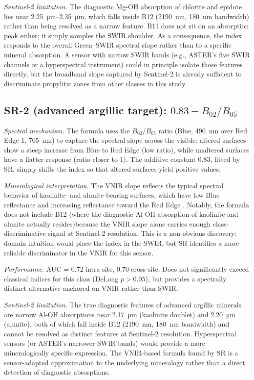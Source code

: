 \documentclass[preprint,authoryear,number]{elsarticle}
\begin{document}
\emph{Sentinel-2 limitation.} The diagnostic Mg-OH absorption of chlorite and epidote lies near \SIrange{2.25}{2.35}{\micro\meter}, which falls inside B12 (\SI{2190}{\nano\meter}, \SI{180}{\nano\meter} bandwidth) rather than being resolved as a narrow feature. B11 does not sit on an absorption peak either; it simply samples the SWIR shoulder. As a consequence, the index responds to the overall Green--SWIR spectral slope rather than to a specific mineral absorption. A sensor with narrow SWIR bands (e.g., ASTER's five SWIR channels or a hyperspectral instrument) could in principle isolate those features directly, but the broadband slope captured by Sentinel-2 is already sufficient to discriminate propylitic zones from other classes in this study.

\subsection{SR-2 (advanced argillic target): $0.83 - B_{02}/B_{05}$}

\emph{Spectral mechanism.} The formula uses the $B_{02}/B_{05}$ ratio (Blue, \SI{490}{\nano\meter} over Red Edge 1, \SI{705}{\nano\meter}) to capture the spectral slope across the visible: altered surfaces show a steep increase from Blue to Red Edge (low ratio), while unaltered surfaces have a flatter response (ratio closer to 1). The additive constant 0.83, fitted by SR, simply shifts the index so that altered surfaces yield positive values.

\emph{Mineralogical interpretation.} The VNIR slope reflects the typical spectral behavior of kaolinite- and alunite-bearing surfaces, which have low Blue reflectance and increasing reflectance toward the Red Edge \citep{Clark1999}. Notably, the formula does not include B12 (where the diagnostic Al-OH absorption of kaolinite and alunite actually resides)because the VNIR slope alone carries enough class-discriminative signal at Sentinel-2 resolution. This is a non-obvious discovery: domain intuition would place the index in the SWIR, but SR identifies a more reliable discriminator in the VNIR for this sensor.

\emph{Performance.} AUC = 0.72 intra-site, 0.70 cross-site. Does not significantly exceed classical indices for this class (DeLong $p > 0.05$), but provides a spectrally distinct alternative anchored on VNIR rather than SWIR.

\emph{Sentinel-2 limitation.} The true diagnostic features of advanced argillic minerals are narrow Al-OH absorptions near \SI{2.17}{\micro\meter} (kaolinite doublet) and \SI{2.20}{\micro\meter} (alunite), both of which fall inside B12 (\SI{2190}{\nano\meter}, \SI{180}{\nano\meter} bandwidth) and cannot be resolved as distinct features at Sentinel-2 resolution. Hyperspectral sensors (or ASTER's narrower SWIR bands) would provide a more mineralogically specific expression. The VNIR-based formula found by SR is a sensor-adapted approximation to the underlying mineralogy rather than a direct detection of diagnostic absorptions.
\end{document}
